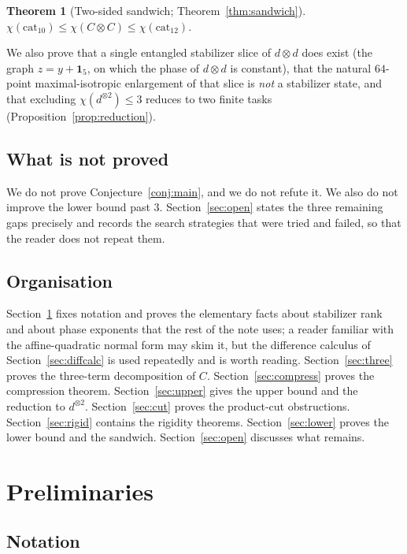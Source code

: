 \documentclass[11pt]{article}
\theoremstyle{plain}
\newtheorem{theorem}{Theorem}[section]
\theoremstyle{definition}
\newcommand{\cat}{\mathrm{cat}}
\newcommand{\one}{\mathbf{1}}
\begin{document}
\begin{theorem}[Two-sided sandwich; Theorem~\ref{thm:sandwich}]
$\chi(\cat_{10})\le\chi(C\otimes C)\le\chi(\cat_{12})$.
\end{theorem}

We also prove that a single entangled stabilizer slice of $d\otimes d$ does exist (the
graph $z=y+\one_5$, on which the phase of $d\otimes d$ is constant), that the natural
$64$-point maximal-isotropic enlargement of that slice is \emph{not} a stabilizer state,
and that excluding $\chi(d^{\otimes2})\le3$ reduces to two finite tasks
(Proposition~\ref{prop:reduction}).

\subsection{What is not proved}

We do not prove Conjecture~\ref{conj:main}, and we do not refute it. We also do not
improve the lower bound past $3$. Section~\ref{sec:open} states the three remaining gaps
precisely and records the search strategies that were tried and failed, so that the
reader does not repeat them.

\subsection{Organisation}

Section~\ref{sec:prelim} fixes notation and proves the elementary facts about stabilizer
rank and about phase exponents that the rest of the note uses; a reader familiar with
the affine-quadratic normal form may skim it, but the difference calculus of
Section~\ref{sec:diffcalc} is used repeatedly and is worth reading. Section~\ref{sec:three}
proves the three-term decomposition of $C$. Section~\ref{sec:compress} proves the
compression theorem. Section~\ref{sec:upper} gives the upper bound and the reduction to
$d^{\otimes2}$. Section~\ref{sec:cut} proves the product-cut obstructions.
Section~\ref{sec:rigid} contains the rigidity theorems. Section~\ref{sec:lower} proves
the lower bound and the sandwich. Section~\ref{sec:open} discusses what remains.

\section{Preliminaries}\label{sec:prelim}

\subsection{Notation}
\end{document}
